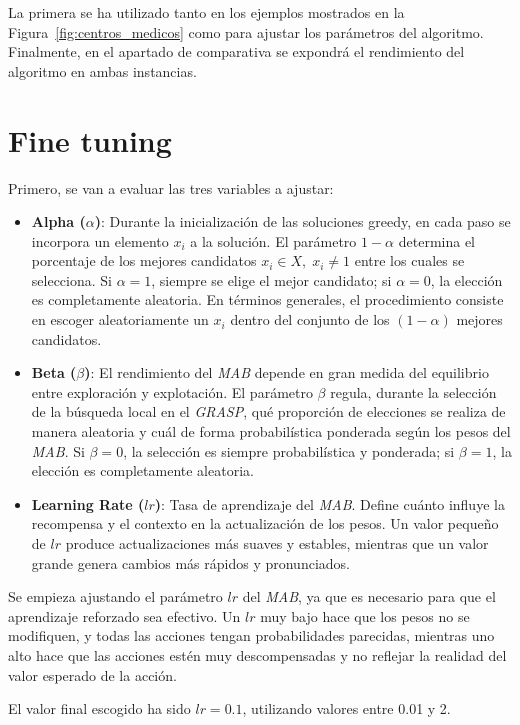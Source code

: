 \documentclass[12pt,a4paper]{book}
\begin{document}
La primera se ha utilizado tanto en los ejemplos mostrados en la Figura~\ref{fig:centros_medicos} como para ajustar los parámetros del algoritmo. Finalmente, en el apartado de comparativa
se expondrá el rendimiento del algoritmo en ambas instancias.

\section{Fine tuning}

Primero, se van a evaluar las tres variables a ajustar:
\begin{itemize}
    \item \textbf{Alpha ($\alpha$)}: Durante la inicialización de las soluciones greedy, en cada paso se incorpora un elemento $x_i$ a la solución. El parámetro $1-\alpha$ determina el porcentaje de los mejores candidatos $x_i \in X, \; x_i \neq 1$ entre los cuales se selecciona.  
Si $\alpha = 1$, siempre se elige el mejor candidato; si $\alpha = 0$, la elección es completamente aleatoria. En términos generales, el procedimiento consiste en escoger aleatoriamente un $x_i$ dentro del conjunto de los $(1-\alpha)$ mejores candidatos.
    \item \textbf{Beta ($\beta$)}: El rendimiento del \textit{MAB} depende en gran medida del equilibrio entre exploración y explotación. El parámetro $\beta$ regula, durante la selección de la búsqueda local en el \textit{GRASP}, qué proporción de elecciones se realiza de manera aleatoria y cuál de forma probabilística ponderada según los pesos del \textit{MAB}.  
Si $\beta = 0$, la selección es siempre probabilística y ponderada; si $\beta = 1$, la elección es completamente aleatoria.
    \item \textbf{Learning Rate ($lr$)}: Tasa de aprendizaje del \textit{MAB}. Define cuánto influye la recompensa y el contexto en la actualización de los pesos. 
Un valor pequeño de $lr$ produce actualizaciones más suaves y estables, mientras que un valor grande genera cambios más rápidos y pronunciados.
\end{itemize}

Se empieza ajustando el parámetro $lr$ del \textit{MAB}, ya que es necesario para que el aprendizaje reforzado sea efectivo. Un $lr$ muy bajo hace que los pesos no se modifiquen, y todas las acciones tengan probabilidades parecidas, mientras uno alto hace que las acciones estén muy descompensadas y no reflejar la realidad del valor esperado de la acción.

El valor final escogido ha sido $lr=0.1$, utilizando valores entre 0.01 y 2.
\end{document}
